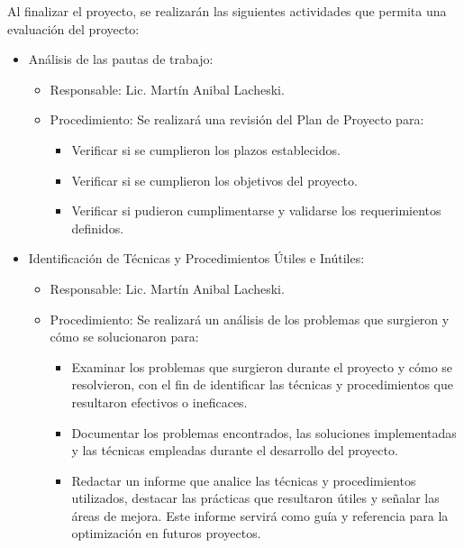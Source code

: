 Al finalizar el proyecto, se realizarán las siguientes actividades que permita
una evaluación del proyecto:

\begin{itemize}
	\item Análisis de las pautas de trabajo:
	      \begin{itemize}
		      \item Responsable: Lic. Martín Anibal Lacheski.
		      \item Procedimiento: Se realizará una revisión del Plan de Proyecto para:
		            \begin{itemize}
			            \item Verificar si se cumplieron los plazos establecidos.
			            \item Verificar si se cumplieron los objetivos del proyecto.
			            \item Verificar si pudieron cumplimentarse y validarse los requerimientos definidos.
		            \end{itemize}
	      \end{itemize}
	\item Identificación de Técnicas y Procedimientos Útiles e Inútiles:
	      \begin{itemize}
		      \item Responsable: Lic. Martín Anibal Lacheski.
		      \item Procedimiento: Se realizará un análisis de los problemas que surgieron y cómo
		            se solucionaron para:
		            \begin{itemize}
			            \item Examinar los problemas que surgieron durante el proyecto y cómo se resolvieron,
			                  con el fin de identificar las técnicas y procedimientos que resultaron
			                  efectivos o ineficaces.
			            \item Documentar los problemas encontrados, las soluciones implementadas y las
			                  técnicas empleadas durante el desarrollo del proyecto.
			            \item Redactar un informe que analice las técnicas y procedimientos utilizados,
			                  destacar las prácticas que resultaron útiles y señalar las áreas de mejora.
			                  Este informe servirá como guía y referencia para la optimización en futuros
			                  proyectos.
		            \end{itemize}
	      \end{itemize}

\end{itemize}
